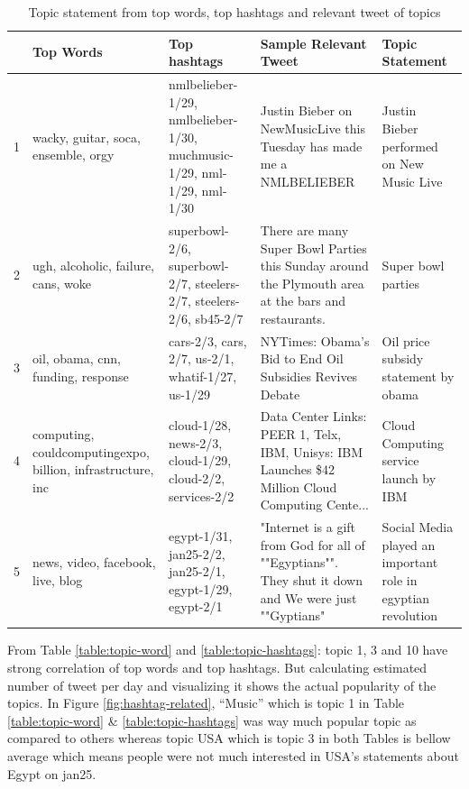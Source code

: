 \documentclass[a4paper]{report}
\begin{document}
\begin{table}[ht!]
\begin{tabular}{|p{0.5cm}|p{3.2cm}|p{3.2cm}|p{3.2cm}|p{3.2cm}|}
\hline  & \bf Top Words & \bf Top hashtags & \bf Sample Relevant Tweet &\bf Topic Statement \\ \hline

1 & wacky, guitar, soca, ensemble, orgy &  nmlbelieber-1/29, nmlbelieber-1/30, muchmusic-1/29, nml-1/29, nml-1/30 & Justin Bieber on NewMusicLive this Tuesday has made me a NMLBELIEBER & Justin Bieber performed on New Music Live \\ \hline

2 & ugh, alcoholic, failure, cans, woke & superbowl-2/6, superbowl-2/7, steelers-2/7, steelers-2/6, sb45-2/7  & There are many Super Bowl Parties this Sunday around the Plymouth area at the bars and restaurants. & Super bowl parties    \\ \hline

3 & oil, obama, cnn, funding, response & cars-2/3, cars, 2/7, us-2/1, whatif-1/27, us-1/29 &  NYTimes: Obama’s Bid to End Oil Subsidies Revives Debate & Oil price subsidy statement by obama \\ \hline

4 & computing, couldcomputingexpo, billion, infrastructure, inc & cloud-1/28, news-2/3, cloud-1/29, cloud-2/2, services-2/2 &   Data Center Links: PEER 1, Telx, IBM, Unisys: IBM Launches \$42 Million Cloud Computing Cente... & Cloud Computing service launch by IBM \\ \hline

5 & news, video, facebook, live, blog & egypt-1/31, jan25-2/2, jan25-2/1, egypt-1/29, egypt-2/1 & "Internet is a gift from God for all of ""Egyptians"". They shut it down and We were just ""Gyptians" & Social Media played an important role in egyptian revolution  \\ \hline
\end{tabular}
\caption{Topic statement from top words, top hashtags and relevant tweet of topics}
\label{table:top-hashtags-word-count}
\end{table}

From Table \ref{table:topic-word} and \ref{table:topic-hashtags}: topic 1, 3 and 10 have strong correlation of top words and top hashtags. But calculating estimated number of tweet per day and visualizing it shows the actual popularity of the topics. In Figure \ref{fig:hashtag-related}, ``Music'' which is topic 1 in Table \ref{table:topic-word} \& \ref{table:topic-hashtags} was way much popular topic as compared to others whereas topic USA which is topic 3 in both Tables is bellow average which means people were not much interested in USA's statements about Egypt on jan25.
\end{document}
